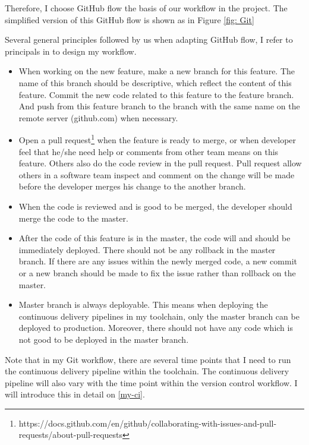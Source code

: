 Therefore, I choose GitHub flow \cite{chacongithub} the basis of our workflow in the project. The simplified version of this GitHub flow is shown as in Figure \ref{fig: Git} 
\par
Several general principles followed by us when adapting GitHub flow, I refer to principals in \cite{chacongithub} to design my workflow.
\begin{itemize}
\item When working on the new feature, make a new branch for this feature. The name of this branch should be descriptive, which reflect the content of this feature. Commit the new code related to this feature to the feature branch. And push from this feature branch to the branch with the same name on the remote server (github.com) when necessary.
\item Open a pull request\footnote{https://docs.github.com/en/github/collaborating-with-issues-and-pull-requests/about-pull-requests} when the feature is ready to merge, or when developer feel that he/she need help or comments from other team means on this feature. Others also do the code review in the pull request. Pull request allow others in a software team inspect and comment on the change will be made before the developer merges his change to the another branch.
\item When the code is reviewed and is good to be merged, the developer should merge the code to the master.
\item After the code of this feature is in the master, the code will and should be immediately deployed. There should not be any rollback in the master branch. If there are any issues within the newly merged code, a new commit or a new branch should be made to fix the issue rather than rollback on the master.
\item Master branch is always deployable. This means when deploying the continuous delivery pipelines in my toolchain, only the master branch can be deployed to production. Moreover, there should not have any code which is not good to be deployed in the master branch.
\end{itemize}
\par
Note that in my Git workflow, there are several time points that I need to run the continuous delivery pipeline within the toolchain. The continuous delivery pipeline will also vary with the time point within the version control workflow. I will introduce this in detail on \ref{my-ci}.
